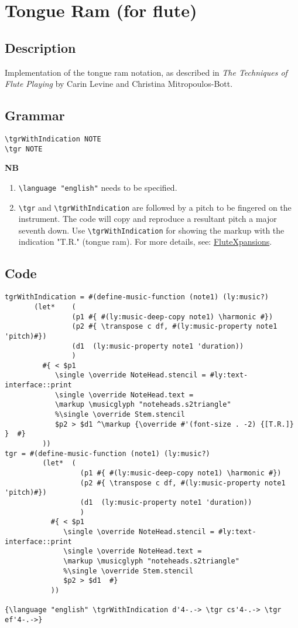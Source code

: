 \documentclass[11pt, oneside]{book}   	%
\begin{document}


\section {Tongue Ram (for flute)}
\hfill
\subsection{Description}
Implementation of the tongue ram notation, as described in \textit{The Techniques of Flute Playing} by Carin Levine and Christina Mitropoulos-Bott.\autocite[28]{RN1695} 
\subsection{Grammar}
\begin{verbatim}
\tgrWithIndication NOTE
\tgr NOTE
\end{verbatim}
\textbf{NB} \begin{enumerate}
\item \verb|\language "english"| needs to be specified. 
\item \verb|\tgr| and \verb|\tgrWithIndication| are followed by a pitch to be fingered on the instrument. The code will copy and reproduce a resultant pitch a major seventh down. Use \verb|\tgrWithIndication| for showing the markup with the indication "T.R." (tongue ram). For more details, see: \href{https://www.flutexpansions.com/tongue-ram}{FluteXpansions}.
\end{enumerate}
\subsection{Code}
\begin{verbatim}
tgrWithIndication = #(define-music-function (note1) (ly:music?)
       (let* 	(
                (p1 #{ #(ly:music-deep-copy note1) \harmonic #})
                (p2 #{ \transpose c df, #(ly:music-property note1 'pitch)#})
                (d1  (ly:music-property note1 'duration))
                )
         #{ < $p1
            \single \override NoteHead.stencil = #ly:text-interface::print
            \single \override NoteHead.text =
            \markup \musicglyph "noteheads.s2triangle"
            %\single \override Stem.stencil
            $p2 > $d1 ^\markup {\override #'(font-size . -2) {[T.R.]} }  #}
         ))
tgr = #(define-music-function (note1) (ly:music?)
         (let* 	(
                  (p1 #{ #(ly:music-deep-copy note1) \harmonic #})
                  (p2 #{ \transpose c df, #(ly:music-property note1 'pitch)#})
                  (d1  (ly:music-property note1 'duration))
                  )
           #{ < $p1
              \single \override NoteHead.stencil = #ly:text-interface::print
              \single \override NoteHead.text =
              \markup \musicglyph "noteheads.s2triangle"
              %\single \override Stem.stencil
              $p2 > $d1  #}
           ))

{\language "english" \tgrWithIndication d'4-.-> \tgr cs'4-.-> \tgr ef'4-.->}
\end{verbatim}
\end{document}

